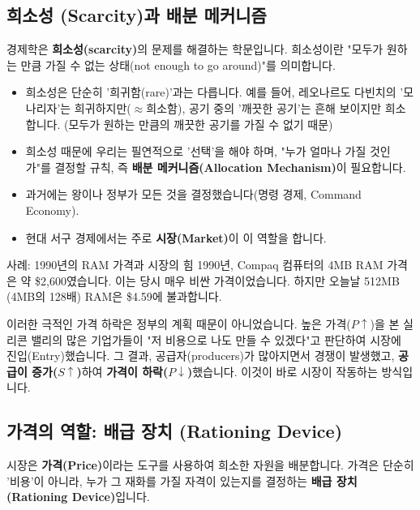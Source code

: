 \documentclass[11pt,a4paper]{book}
\theoremstyle{definition}
\begin{document}
\subsection{희소성 (Scarcity)과 배분 메커니즘}

경제학은 \textbf{희소성(scarcity)}의 문제를 해결하는 학문입니다.
희소성이란 "모두가 원하는 만큼 가질 수 없는 상태(not enough to go around)"를 의미합니다.

\begin{itemize}
    \item 희소성은 단순히 '희귀함(rare)'과는 다릅니다. 예를 들어, 레오나르도 다빈치의 '모나리자'는 희귀하지만($\approx$희소함), 공기 중의 '깨끗한 공기'는 흔해 보이지만 희소합니다. (모두가 원하는 만큼의 깨끗한 공기를 가질 수 없기 때문)
    \item 희소성 때문에 우리는 필연적으로 '선택'을 해야 하며, "누가 얼마나 가질 것인가"를 결정할 규칙, 즉 \textbf{배분 메커니즘(Allocation Mechanism)}이 필요합니다.
    \item 과거에는 왕이나 정부가 모든 것을 결정했습니다(명령 경제, Command Economy).
    \item 현대 서구 경제에서는 주로 \textbf{시장(Market)}이 이 역할을 합니다.
\end{itemize}

\begin{mybox}{사례: 1990년의 RAM 가격과 시장의 힘}
    1990년, Compaq 컴퓨터의 4MB RAM 가격은 약 \$2,600였습니다. 이는 당시 매우 비싼 가격이었습니다. 하지만 오늘날 512MB (4MB의 128배) RAM은 \$4.59에 불과합니다.

    이러한 극적인 가격 하락은 정부의 계획 때문이 아니었습니다.
    높은 가격($P \uparrow$)을 본 실리콘 밸리의 많은 기업가들이 "저 비용으로 나도 만들 수 있겠다"고 판단하여 시장에 진입(Entry)했습니다.
    그 결과, 공급자(producers)가 많아지면서 경쟁이 발생했고, \textbf{공급이 증가($S \uparrow$)}하여 \textbf{가격이 하락($P \downarrow$)}했습니다.
    이것이 바로 시장이 작동하는 방식입니다.
\end{mybox}

\subsection{가격의 역할: 배급 장치 (Rationing Device)}

시장은 \textbf{가격(Price)}이라는 도구를 사용하여 희소한 자원을 배분합니다.
가격은 단순히 '비용'이 아니라, 누가 그 재화를 가질 자격이 있는지를 결정하는 \textbf{배급 장치(Rationing Device)}입니다.
\end{document}
